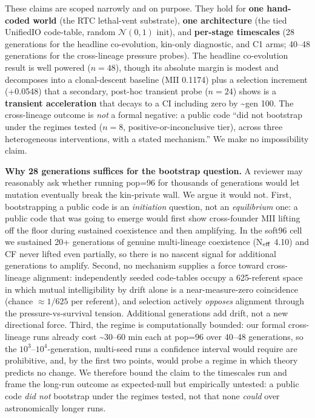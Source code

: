 \documentclass[12pt,letterpaper]{article}
\begin{document}
These claims are scoped narrowly and on purpose. They hold for \textbf{one hand-coded world}
(the RTC lethal-vent substrate), \textbf{one architecture} (the tied UnifiedIO code-table,
random $\mathcal{N}(0,1)$ init), and \textbf{per-stage timescales} (28 generations for the
headline co-evolution, kin-only diagnostic, and C1 arms; 40--48 generations for the
cross-lineage pressure probes). The headline co-evolution result is well powered ($n{=}48$),
though its absolute margin is modest and decomposes into a clonal-descent baseline (MII
0.1174) plus a selection increment (+0.0548) that a secondary, post-hoc transient probe
($n{=}24$) shows is a \textbf{transient acceleration} that decays to a CI including zero by
\textasciitilde{}gen 100. The cross-lineage outcome is \emph{not} a formal negative: a public
code ``did not bootstrap under the regimes tested ($n{=}8$, positive-or-inconclusive tier),
across three heterogeneous interventions, with a stated mechanism.'' We make no impossibility
claim.

\textbf{Why 28 generations suffices for the bootstrap question.} A reviewer may reasonably
ask whether running pop=96 for thousands of generations would let mutation eventually break
the kin-private wall. We argue it would not. First, bootstrapping a public code is an
\emph{initiation} question, not an \emph{equilibrium} one: a public code that was going to
emerge would first show cross-founder MII lifting off the floor during sustained coexistence
and then amplifying. In the soft96 cell we sustained 20+ generations of genuine multi-lineage
coexistence (N$_{\rm eff}$ 4.10) and CF never lifted even partially, so there is no nascent
signal for additional generations to amplify. Second, no mechanism supplies a force toward
cross-lineage alignment: independently seeded code-tables occupy a 625-referent space in which
mutual intelligibility by drift alone is a near-measure-zero coincidence
(chance $\approx 1/625$ per referent), and selection actively \emph{opposes} alignment through
the pressure-vs-survival tension. Additional generations add drift, not a new directional
force. Third, the regime is computationally bounded: our formal cross-lineage runs already
cost \textasciitilde{}30--60 min each at pop=96 over 40--48 generations, so the
$10^3$--$10^4$-generation, multi-seed runs a confidence interval would require are
prohibitive, and, by the first two points, would probe a regime in which theory predicts no
change. We therefore bound the claim to the timescales run and frame the long-run outcome as
expected-null but empirically untested: a public code \emph{did not} bootstrap under the
regimes tested, not that none \emph{could} over astronomically longer runs.
\end{document}
